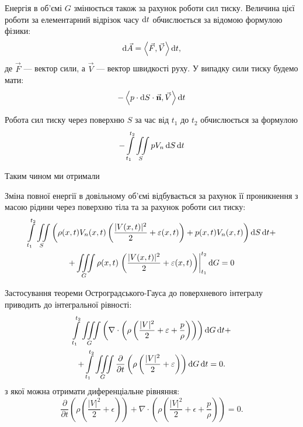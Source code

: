 Енергія в об'ємі $G$ змінюється також за рахунок роботи сил тиску. Величина цієї роботи за елементарний відрізок часу $\mathop{}\!\mathrm{d} t$ обчислюється за відомою формулою фізики:
\begin{equation}
	\mathop{}\!\mathrm{d} \vec A = \left\langle \vec F, \vec V \right\rangle \mathop{}\!\mathrm{d} t,
\end{equation}
де $\vec F$ --- вектор сили, а $\vec V$ --- вектор швидкості руху. У випадку сили тиску будемо мати:
\begin{equation}
	- \left\langle p \cdot \mathop{}\!\mathrm{d} S \cdot \vec{\textbf{n}}, \vec V \right\rangle \mathop{}\!\mathrm{d} t
\end{equation}

Робота сил тиску через поверхню $S$ за час від $t_1$ до $t_2$ обчислюється за формулою
\begin{equation}
	- \displaystyle\int\limits_{t_1}^{t_2} \displaystyle\iint\limits_S  p  V_n \mathop{}\!\mathrm{d} S \mathop{}\!\mathrm{d} t
\end{equation}

Таким чином ми отримали
\begin{law}
	Зміна повної енергії в довільному об'ємі відбувається за рахунок її проникнення з масою рідини через поверхню тіла та за рахунок роботи сил тиску:
	\begin{multline}
		\displaystyle\int\limits_{t_1}^{t_2} \displaystyle\iint\limits_S \left( \rho(x, t) V_n(x, t) \left( \frac{|V(x, t)|^2}{2} + \varepsilon(x, t) \right) + p(x, t) V_n(x, t) \right) \mathop{}\!\mathrm{d} S \mathop{}\!\mathrm{d} t + \\
		+ \displaystyle\iiint\limits_G \rho(x, t) \left. \left( \frac{|V(x, t)|^2}{2} + \varepsilon(x, t) \right) \right|_{t_1}^{t_2} \mathop{}\!\mathrm{d} G = 0
	\end{multline}
\end{law}

Застосування теореми Остроградського-Гауса до поверхневого інтегралу приводить до інтегральної рівності:
\begin{multline}
	\displaystyle\int\limits_{t_1}^{t_2} \displaystyle\iiint\limits_G \left(\nabla \cdot \left( \rho \left( \frac{|V|^2}{2} + \varepsilon + \frac{p}{\rho} \right) \right)\right) \mathop{}\!\mathrm{d} G \mathop{}\!\mathrm{d} t + \\
	+ \displaystyle\int\limits_{t_1}^{t_2} \displaystyle\iiint\limits_G \frac{\partial}{\partial t} \left( \rho \left( \frac{|V|^2}{2} + \varepsilon \right) \right) \mathop{}\!\mathrm{d} G \mathop{}\!\mathrm{d} t = 0.
\end{multline}
з якої можна отримати диференціальне рівняння:
\begin{equation}
	\frac{\partial}{\partial t} \left( \rho \left( \frac{|V|^2}{2} + \epsilon \right) \right) +\nabla \cdot \left( \rho \left( \frac{|V|^2}{2} + \epsilon + \frac{p}{\rho} \right) \right) = 0.
\end{equation}

